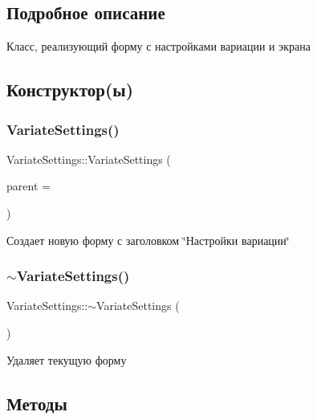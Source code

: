 \subsection{Подробное описание}
Класс, реализующий форму с настройками вариации и экрана 

\subsection{Конструктор(ы)}
\mbox{\label{class_variate_settings_a8bf7d8b1de5d49503c4dd63f70bed391}} 
\subsubsection{\texorpdfstring{Variate\+Settings()}{VariateSettings()}}
{\footnotesize\ttfamily Variate\+Settings\+::\+Variate\+Settings (\begin{DoxyParamCaption}\item[{Q\+Widget $\ast$}]{parent = {} }\end{DoxyParamCaption})\hspace{0.3cm}{\ttfamily [explicit]}}

Создает новую форму с заголовком \char`\"{}Настройки вариации\char`\"{} \mbox{\label{class_variate_settings_aaf7b11850687596d1b2dc5acc63a8e8b}} 
\subsubsection{\texorpdfstring{$\sim$\+Variate\+Settings()}{~VariateSettings()}}
{\footnotesize\ttfamily Variate\+Settings\+::$\sim$\+Variate\+Settings (\begin{DoxyParamCaption}{ }\end{DoxyParamCaption})}

Удаляет текущую форму 

\subsection{Методы}
\mbox{\label{class_variate_settings_a9c5e8f6c8cd83075bf9c71af36bebfa2}} 
